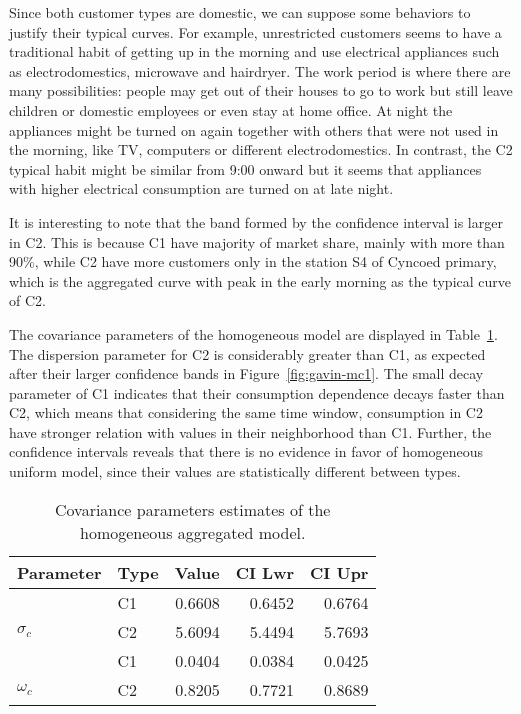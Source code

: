 Since both customer types are domestic, we can suppose some behaviors to justify their typical curves. For example, unrestricted customers seems to have a traditional habit of getting up in the morning and use electrical appliances such as electrodomestics, microwave and hairdryer. The work period is where there are many possibilities: people may get out of their houses to go to work but still leave children or domestic employees or even stay at home office. At night the appliances might be turned on again together with others that were not used in the morning, like TV, computers or different electrodomestics. In contrast, the C2 typical habit might be similar from 9:00 onward but it seems that appliances with higher electrical consumption are turned on at late night. 

It is interesting to note that the band formed by the confidence interval is larger in C2. This is because C1 have majority of market share, mainly with more than 90\%, while C2 have more customers only in the station S4 of Cyncoed primary, which is the aggregated curve with peak in the early morning as the typical curve of C2.

The covariance parameters of the homogeneous model are displayed in Table~\ref{tab:gavin-pars1}. The dispersion parameter for C2 is considerably greater than C1, as expected after their larger confidence bands in Figure~\ref{fig:gavin-mc1}. The small decay parameter of C1 indicates that their consumption  dependence decays faster than C2, which means that considering the same time window, consumption in C2 have stronger relation with values in their neighborhood than C1. Further, the confidence intervals reveals that there is no evidence in favor of homogeneous uniform model, since their values are statistically different between types.


\begin{table}[b]\centering
\caption{Covariance parameters estimates of the homogeneous aggregated model.}
\begin{knitrout}
\color{fgcolor}
\begin{tabular}{llrrr}
\toprule
Parameter & Type & Value & CI Lwr & CI Upr\\
\midrule
 & C1 & 0.6608 & 0.6452 & 0.6764\\

\multirow{-2}{*}{\raggedright\arraybackslash $\sigma_c$} & C2 & 5.6094 & 5.4494 & 5.7693\\
\cmidrule{1-5}
 & C1 & 0.0404 & 0.0384 & 0.0425\\

\multirow{-2}{*}{\raggedright\arraybackslash $\omega_c$} & C2 & 0.8205 & 0.7721 & 0.8689\\
\bottomrule
\end{tabular}


\end{knitrout}
\label{tab:gavin-pars1}
\end{table}

